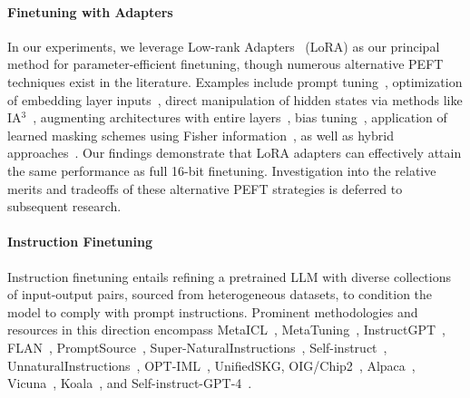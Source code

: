 \paragraph{Finetuning with Adapters} In our experiments, we leverage Low-rank Adapters~\citep{hu2021lora} (LoRA) as our principal method for parameter-efficient finetuning, though numerous alternative PEFT techniques exist in the literature. Examples include prompt tuning~\citep{qin2021learning,lester2021power,li2021prefix}, optimization of embedding layer inputs~\citep{an2022input}, direct manipulation of hidden states via methods like IA$^3$~\citep{liu2022few}, augmenting architectures with entire layers~\citep{houlsby2019parameter}, bias tuning~\citep{zaken2021bitfit}, application of learned masking schemes using Fisher information~\citep{sung2021training}, as well as hybrid approaches~\citep{henderson2021compacter}. Our findings demonstrate that LoRA adapters can effectively attain the same performance as full 16-bit finetuning. Investigation into the relative merits and tradeoffs of these alternative PEFT strategies is deferred to subsequent research.

\paragraph{Instruction Finetuning} Instruction finetuning entails refining a pretrained LLM with diverse collections of input-output pairs, sourced from heterogeneous datasets, to condition the model to comply with prompt instructions. Prominent methodologies and resources in this direction encompass MetaICL~\citep{min2021metaicl}, MetaTuning~\citep{zhong2021adapting}, InstructGPT~\citep{ouyang2022training}, FLAN~\citep{wei2021finetuned,chung2022scaling}, PromptSource~\citep{bach2022promptsource}, Super-NaturalInstructions~\citep{wang2022super,sanh2021multitask}, Self-instruct~\citep{wang2022self}, UnnaturalInstructions~\citep{honovich2022unnatural}, OPT-IML~\citep{iyer2022opt}, UnifiedSKG\citep{xie2022unifiedskg}, OIG/Chip2~\citep{laion2023}, Alpaca~\citep{alpaca}, Vicuna~\citep{vicuna2023}, Koala~\citep{koala_blogpost_2023}, and Self-instruct-GPT-4~\citep{peng2023instruction}.

